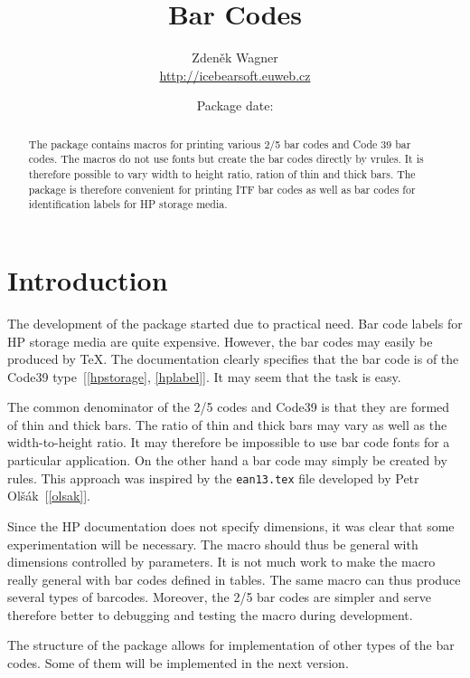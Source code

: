 \documentclass[11pt]{article}
\begin{document}
\raggedbottom

\title{Bar Codes}
\author{Zdeněk Wagner\\\url{http://icebearsoft.euweb.cz}}
\date{Package date: }
\maketitle

\begin{abstract}\noindent
The package contains macros for printing various 2/5 bar codes and Code 39
bar codes. The macros do not use fonts but create the bar codes directly
by vrules. It is therefore possible to vary width to height ratio, ration
of thin and thick bars. The package is therefore convenient for printing
ITF bar codes as well as bar codes for identification labels for HP
storage media.
\end{abstract}

\tableofcontents

\section{Introduction}
The development of the package started due to practical need. Bar code labels for HP storage media
are quite expensive. However, the bar codes may easily be produced by \TeX. The documentation
clearly specifies that the bar code is of the Code39 type~[\ref{hpstorage}, \ref{hplabel}]. 
It may seem that the task is easy.

The common denominator of the 2/5 codes and Code39 is that they are formed of thin and thick bars.
The ratio of thin and thick bars may vary as well as the width-to-height ratio. It may therefore be
impossible to use bar code fonts for a particular application. On the other hand a bar code may
simply be created by rules. This approach was inspired by the \texttt{ean13.tex} file developed by
Petr Olšák~[\ref{olsak}].

Since the HP documentation does not specify dimensions, it was clear that some experimentation will
be necessary. The macro should thus be general with dimensions controlled by parameters. It is not
much work to make the macro really general with bar codes defined in tables. The same macro can
thus produce several types of barcodes. Moreover, the 2/5 bar codes are simpler and serve therefore
better to debugging and testing the macro during development.

The structure of the package allows for implementation of other types of the bar codes. Some of
them will be implemented in the next version.
\end{document}
